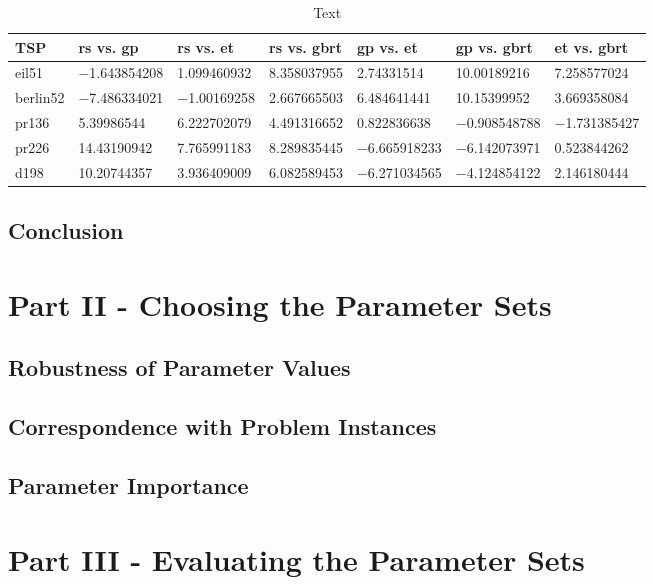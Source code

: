 \begin{table}[h]
	\centering
	\caption{Text}
	\label{tab:conover-t}
	
	\begin{adjustbox}{width=1\textwidth}
	\begin{tabular}{ l | l | l | l | l | l | l}
		TSP & \gls{rs} vs. \gls{gp} & \gls{rs} vs. \gls{et} & \gls{rs} vs. \gls{gbrt} & \gls{gp} vs. \gls{et} & \gls{gp} vs. \gls{gbrt} & \gls{et} vs. \gls{gbrt} \\ \hline
		eil51 & \num{-1,643854208} & \num{1,099460932} & \cellcolor{green!25} \num{8,358037955} & \cellcolor{green!25} \num{2,74331514} & \cellcolor{green!25} \num{10,00189216} & \cellcolor{green!25} \num{7,258577024} \\ \hline
		berlin52 & \cellcolor{green!25} \num{-7,486334021} & \num{-1,00169258} & \num{2,667665503} & \cellcolor{green!25} \num{6,484641441} & \cellcolor{green!25} \num{10,15399952} & \cellcolor{green!25} \num{3,669358084} \\ \hline
		pr136 & \cellcolor{green!25} \num{5,39986544} & \cellcolor{green!25} \num{6,222702079} & \cellcolor{green!25} \num{4,491316652} & \num{0,822836638} & \num{-0,908548788} & \num{-1,731385427} \\ \hline
    	pr226 & \cellcolor{green!25} \num{14,43190942} & \cellcolor{green!25} \num{7,765991183} & \cellcolor{green!25} \num{8,289835445} & \cellcolor{green!25} \num{-6,665918233} & \cellcolor{green!25} \num{-6,142073971} & \num{0,523844262} \\ \hline
    	d198 & \cellcolor{green!25} \num{10,20744357} & \cellcolor{green!25} \num{3,936409009} & \cellcolor{green!25} \num{6,082589453} & \cellcolor{green!25} \num{-6,271034565} & \cellcolor{green!25} \num{-4,124854122} & \num{2,146180444} \\ \hline
	\end{tabular}
	\end{adjustbox}
\end{table}

\subsection{Conclusion}

\section{Part II - Choosing the Parameter Sets}
\label{chap:part2}

\subsection{Robustness of Parameter Values}

\subsection{Correspondence with Problem Instances}

\subsection{Parameter Importance}


\section{Part III - Evaluating the Parameter Sets}
